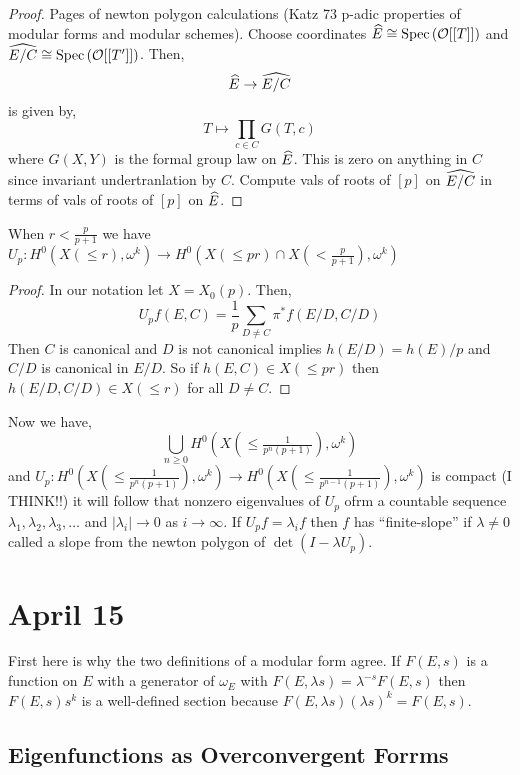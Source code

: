 \documentclass[12pt]{article}
\begin{document}
\begin{proof}
Pages of newton polygon calculations (Katz 73 p-adic properties of modular forms and modular schemes). Choose coordinates $\widehat{E} \cong \mathrm{Spec}\left( \mathcal{O}[[T]] \right)$ and $\widehat{E/C} \cong \mathrm{Spec}\left( \mathcal{O}[[T']] \right)$. Then,
\[ \widehat{E} \to \widehat{E/C} \]
is given by,
\[ T \mapsto \prod_{c \in C} G(T, c) \]
where $G(X,Y)$ is the formal group law on $\widehat{E}$. This is zero on anything in $C$ since invariant undertranlation by $C$. Compute vals of roots of $[p]$ on $\widehat{E/C}$ in terms of vals of roots of $[p]$ on $\widehat{E}$. 
\end{proof}

\begin{prop}
When $r < \frac{p}{p+1}$ we have $U_p : H^0(X(\le r), \omega^k) \to H^0(X(\le pr) \cap X(<\tfrac{p}{p+1}), \omega^k)$
\end{prop}

\begin{proof}
In our notation let $X = X_0(p)$. Then,
\[ U_p f(E, C) = \frac{1}{p} \sum_{D \neq C} \pi^* f(E/D, C/D) \]
Then $C$ is canonical and $D$ is not canonical implies $h(E/D) = h(E) / p$ and $C/D$ is canonical in $E/D$. So if $h(E,C) \in X(\le pr)$ then $h(E/D, C/D) \in X(\le r)$ for all $D \neq C$. 
\end{proof}

\begin{rmk}
Now we have,
\[ \bigcup_{n \ge 0} H^0(X(\le \tfrac{1}{p^n(p+1)}), \omega^k) \]
and $U_p :  H^0(X(\le \tfrac{1}{p^n(p+1)}), \omega^k) \to  H^0(X(\le \tfrac{1}{p^{n-1}(p+1)}), \omega^k)$ is compact (I THINK!!)
it will follow that nonzero eigenvalues of $U_p$ ofrm a countable sequence $\lambda_1, \lambda_2, \lambda_3, \dots$ and $|\lambda_i| \to 0$ as $i \to \infty$. If $U_p f = \lambda_i f$ then $f$ has ``finite-slope'' if $\lambda \neq 0$ called a slope from the newton polygon of $\det{(I - \lambda U_p)}$.
\end{rmk}

\section{April 15}

First here is why the two definitions of a modular form agree. If $F(E, s)$ is a function on $E$ with a generator of $\omega_E$ with $F(E,\lambda s) = \lambda^{-s} F(E, s)$ then $F(E, s) s^k$ is a well-defined section because $F(E, \lambda s) (\lambda s)^k = F(E, s)$. 

\subsection{Eigenfunctions as Overconvergent Forrms}
\end{document}
